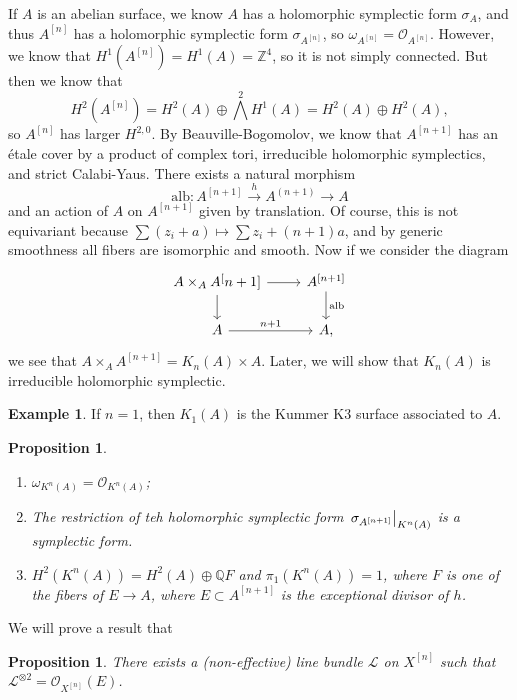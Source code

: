 \documentclass[leqno, openany]{memoir}
\newtheorem{prop}[thm]{Proposition}
\theoremstyle{definition}
\newtheorem{exm}[thm]{Example}
\theoremstyle{remark}
\theoremstyle{plain}
\theoremstyle{definition}
\theoremstyle{remark}
\newcommand{\Z}{\mathbb{Z}}
\newcommand{\Q}{\mathbb{Q}}
\newcommand{\mc}[1]{\mathcal{#1}}
\newcommand{\mr}[1]{\mathrm{#1}}
\begin{document}
If $A$ is an abelian surface, we know $A$ has a holomorphic symplectic form $\sigma_A$, and thus $A^{[n]}$ has a holomorphic symplectic form $\sigma_{A^[n]}$, so $\omega_{A^{[n]}} = \mc{O}_{A^[n]}$. However, we know that $H^1(A^[n]) = H^1(A) = \Z^4$, so it is not simply connected. But then we know that 
\[ H^2(A^{[n]}) = H^2(A) \oplus {\bigwedge}^2 H^1(A) = H^2(A) \oplus H^2(A), \] 
so $A^[n]$ has larger $H^{2,0}$. By Beauville-Bogomolov, we know that $A^{[n+1]}$ has an \'etale cover by a product of complex tori, irreducible holomorphic symplectics, and strict Calabi-Yaus. There exists a natural morphism
\[ \mr{alb} \colon A^[n+1] \xrightarrow{h} A^{(n+1)} \to A \]
and an action of $A$ on $A^{[n+1]}$ given by translation. Of course, this is not equivariant because $\sum (z_i + a) \mapsto \sum z_i + (n+1)a$, and by generic smoothness all fibers are isomorphic and smooth. Now if we consider the diagram
\begin{equation*}
\begin{tikzcd}
    A \times_A A^[n+1] \ar{r} \ar{d} & A^{[n+1]} \ar{d}{\mr{alb}} \\
    A \ar{r}{n+1} & A,
\end{tikzcd}
\end{equation*}
we see that $A \times_A A^{[n+1]} = K_n(A) \times A$. Later, we will show that $K_n(A)$ is irreducible holomorphic symplectic.

\begin{exm}
    If $n = 1$, then $K_1(A)$ is the Kummer K3 surface associated to $A$.
\end{exm}

\begin{prop}\leavevmode
    \begin{enumerate}
        \item $\omega_{K^n(A)} = \mc{O}_{K^n(A)}$;
        \item The restriction of teh holomorphic symplectic form $\eval{\sigma_{A^{[n+1]}}}_{K^n(A)}$ is a symplectic form.
        \item $H^2(K^n(A)) = H^2(A) \oplus \Q F$ and $\pi_1(K^n(A)) = 1$, where $F$ is one of the fibers of $E \to A$, where $E \subset A^[n+1]$ is the exceptional divisor of $h$.
    \end{enumerate}
\end{prop}

We will prove a result that 
\begin{prop}
    There exists a (non-effective) line bundle $\mc{L}$ on $X^{[n]}$ such that $\mc{L}^{\otimes 2} = \mc{O}_{X^{[n]}}(E)$.
\end{prop}
\end{document}
